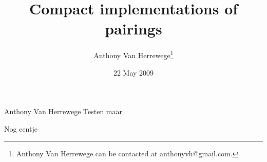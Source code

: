 \documentclass[a4paper, 10pt]{IEEEtran}
\title{Compact implementations of pairings}
\author{Anthony Van Herrewege\thanks{Anthony Van Herrewege can be contacted at anthonyvh@gmail.com.}}
\date{22 May 2009}
\begin{document}


\maketitle







\begin{IEEEbiography}
{Anthony Van Herrewege} Testen maar

Nog eentje
\end{IEEEbiography}


\end{document}

